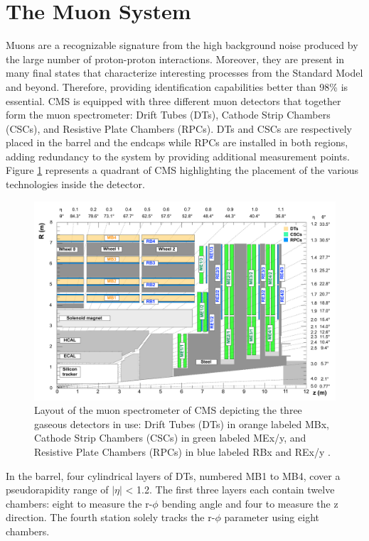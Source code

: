   \section{The Muon System}

    Muons are a recognizable signature from the high background noise produced by the large number of proton-proton interactions. Moreover, they are present in many final states that characterize interesting processes from the Standard Model and beyond. Therefore, providing identification capabilities better than 98\% is essential. CMS is equipped with three different muon detectors that together form the muon spectrometer: Drift Tubes (DTs), Cathode Strip Chambers (CSCs), and Resistive Plate Chambers (RPCs). DTs and CSCs are respectively placed in the barrel and the endcaps while RPCs are installed in both regions, adding redundancy to the system by providing additional measurement points. Figure \ref{fig:I-3-muons} represents a quadrant of CMS highlighting the placement of the various technologies inside the detector. \\

    \begin{figure}[h!]
      \centering
      \includegraphics[width=\textwidth]{img/I-3-cms/muons.pdf}
      \caption{Layout of the muon spectrometer of CMS depicting the three gaseous detectors in use: Drift Tubes (DTs) in orange labeled MBx, Cathode Strip Chambers (CSCs) in green labeled MEx/y, and Resistive Plate Chambers (RPCs) in blue labeled RBx and REx/y \cite{1748-0221-3-08-S08004}.}
      \label{fig:I-3-muons}
    \end{figure}

    In the barrel, four cylindrical layers of DTs, numbered MB1 to MB4, cover a pseudorapidity range of $ | \eta | $ < 1.2. The first three layers each contain twelve chambers: eight to measure the r-$\phi$ bending angle and four to measure the z direction. The fourth station solely tracks the r-$\phi$ parameter using eight chambers. \\

